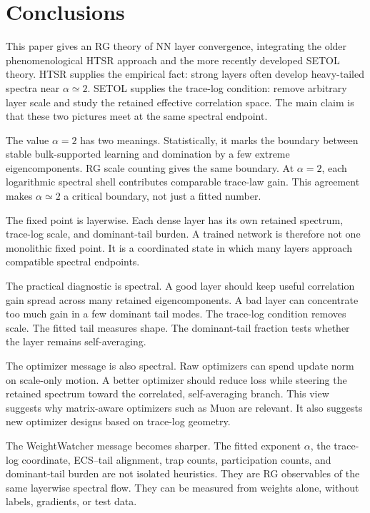 \documentclass[10pt,twocolumn]{article}
\begin{document}
\clearpage
\section{Conclusions}
\label{sxn:conclusions}

This paper gives an RG theory of NN layer convergence, integrating the older phenomenological HTSR approach and the more recently developed
SETOL theory. HTSR supplies the empirical fact: strong layers often develop heavy-tailed spectra near $\alpha\simeq2$. SETOL supplies the trace-log condition: remove arbitrary layer scale and study the retained effective correlation space. The main claim is that these two pictures meet at the same spectral endpoint.

The value $\alpha=2$ has two meanings. Statistically, it marks the boundary between stable bulk-supported learning and domination by a few extreme eigencomponents. RG scale counting gives the same boundary. At $\alpha=2$, each logarithmic spectral shell contributes comparable trace-law gain. This agreement makes $\alpha\simeq2$ a critical boundary, not just a fitted number.

The fixed point is layerwise. Each dense layer has its own retained spectrum, trace-log scale, and dominant-tail burden. A trained network is therefore not one monolithic fixed point. It is a coordinated state in which many layers approach compatible spectral endpoints.

The practical diagnostic is spectral. A good layer should keep useful correlation gain spread across many retained eigencomponents. A bad layer can concentrate too much gain in a few dominant tail modes. The trace-log condition removes scale. The fitted tail measures shape. The dominant-tail fraction tests whether the layer remains self-averaging.

The optimizer message is also spectral. Raw optimizers can spend update norm on scale-only motion. A better optimizer should reduce loss while steering the retained spectrum toward the correlated, self-averaging branch. This view suggests why matrix-aware optimizers such as Muon are relevant. It also suggests new optimizer designs based on trace-log geometry.

The WeightWatcher message becomes sharper. The fitted exponent $\alpha$, the trace-log coordinate, ECS--tail alignment, trap counts, participation counts, and dominant-tail burden are not isolated heuristics. They are RG observables of the same layerwise spectral flow. They can be measured from weights alone, without labels, gradients, or test data.
\end{document}
